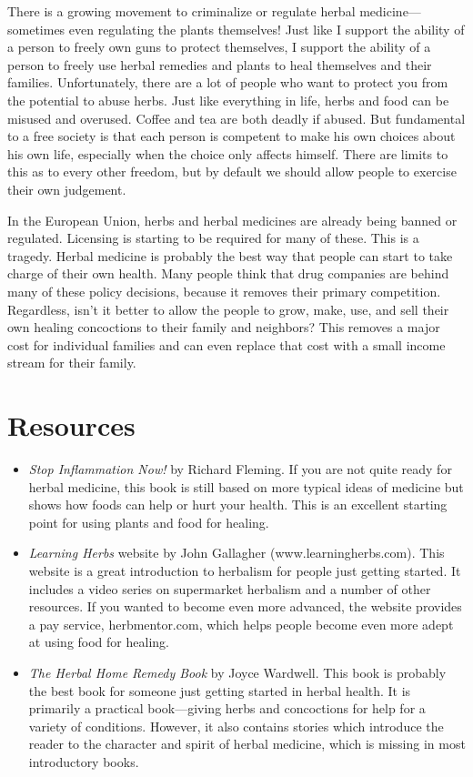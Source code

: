 There is a growing movement to criminalize or regulate herbal
medicine—sometimes even regulating the plants themselves!  Just like I
support the ability of a person to freely own guns to protect
themselves, I support the ability of a person to freely use herbal
remedies and plants to heal themselves and their families.
Unfortunately, there are a lot of people who want to
{\textquotedbl}protect{\textquotedbl} you from the potential to abuse
herbs. Just like everything in life, herbs and food can be misused and
overused. Coffee and tea are both deadly if abused. But fundamental to
a free society is that each person is competent to make
his own choices about
his own life,
especially when the choice only affects himself.  There are limits to
this as to every other freedom, but by default we should allow people
to exercise their own judgement.

In the European Union, herbs and herbal medicines are already being
banned or regulated. Licensing is starting to be required for many of
these. This is a tragedy. Herbal medicine is probably the best way that
people can start to take charge of their own health. Many people think
that drug companies are behind many of these policy decisions, because
it removes their primary competition.
Regardless,
isn’t it better to
allow the people to
grow, make, use, and sell their own healing concoctions to their family
and neighbors?  This removes a major cost
for individual
families and can even replace
that
cost with a small
income stream for their family.

\section{Resources}

\begin{itemize}
\item 
\textit{Stop Inflammation Now!} by Richard Fleming. If you are not quite
ready for herbal medicine, this book is still based on more typical
ideas of medicine but shows how foods can help or hurt your health.
This is an excellent starting point for using plants and food for
healing.
\item 
\textit{Learning Herbs} website by John Gallagher
(www.learningherbs.com). This website is a great introduction to
herbalism for people just getting started. It includes a video series
on supermarket herbalism and a number of other resources. If you wanted
to become even more advanced, the website provides a pay service,
herbmentor.com, which helps people become even more adept at using food
for healing.
\item 
\textit{The Herbal Home Remedy Book} by Joyce Wardwell. This book is
probably the best book for someone just getting started in herbal
health. It is primarily a practical book—giving herbs and concoctions
for help for a variety of conditions. However, it also contains stories
which introduce the reader to the character and spirit of herbal
medicine, which is missing in most introductory books.
\end{itemize}

